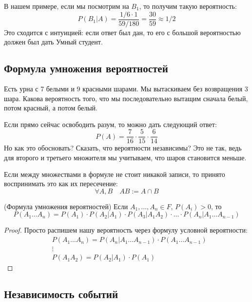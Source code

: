 \begin{example}
	В нашем примере, если мы посмотрим на $B_1$, то получим такую вероятность:
	\[
		P(B_1 | A) = \frac{1 / 6 \cdot 1}{59 / 180} = \frac{30}{59} \approx 1 / 2
	\]
	Это сходится с интуицией: если ответ был дан, то его с большой вероятностью должен был дать Умный студент.
\end{example}

\subsection{Формула умножения вероятностей}

\begin{example}
	Есть урна с 7 белыми и 9 красными шарами. Мы вытаскиваем без возвращения 3 шара. Какова вероятность того, что мы последовательно вытащим сначала белый, потом красный, а потом белый.
	
	Если прямо сейчас освободить разум, то можно дать следующий ответ:
	\[
		P(A) = \frac{7}{16} \cdot \frac{5}{15} \cdot \frac{6}{14}
	\]
	Но как это обосновать? Сказать, что вероятности независимы? Это не так, ведь для второго и третьего множителя мы учитываем, что шаров становится меньше.
\end{example}

\begin{note}
	Если между множествами в формуле не стоит никакой записи, то принято воспринимать это как их пересечение:
	\[
		\forall A, B \quad AB := A \cap B
	\]
\end{note}

\begin{theorem} (Формула умножения вероятностей)
	Если $A_1, \ldots, A_n \in F$, $P(A_i) > 0$, то
	\[
		P(A_1 \ldots A_n) = P(A_1) \cdot P(A_2 | A_1) \cdot P(A_3 | A_1A_2) \cdot \ldots \cdot P(A_n | A_1 \ldots A_{n - 1})
	\]
\end{theorem}

\begin{proof}
	Просто распишем нашу вероятность через формулу условной вероятности:
	\begin{align*}
		&{P(A_1 \ldots A_n) = P(A_n | A_1 \ldots A_{n - 1}) \cdot P(A_1 \ldots A_{n - 1})}
		\\
		&{\vdots}
		\\
		&{P(A_1 A_2) = P(A_2 | A_1) \cdot P(A_1)}
	\end{align*}
\end{proof}

\subsection{Независимость событий}


